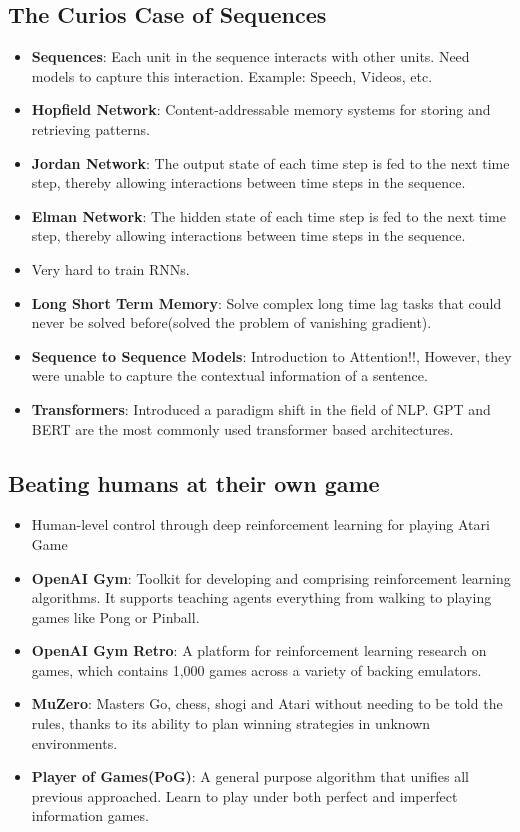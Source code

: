 \documentclass[a4paper]{article}
\begin{document}
\subsection{The Curios Case of Sequences}
\begin{itemize}
    \item \textbf{Sequences}: Each unit in the sequence interacts with other units. Need models to capture this interaction. Example: Speech, Videos, etc.
    \item \textbf{Hopfield Network}: Content-addressable memory systems for storing and retrieving patterns.
    \item \textbf{Jordan Network}: The output state of each time step is fed to the next time step, thereby allowing interactions between time steps in the sequence.
    \item \textbf{Elman Network}: The hidden state of each time step is fed to the next time step, thereby allowing interactions between time steps in the sequence.
    \item Very hard to train RNNs.
    \item \textbf{Long Short Term Memory}: Solve complex long time lag tasks that could never be solved before(solved the problem of vanishing gradient).
    \item \textbf{Sequence to Sequence Models}: Introduction to Attention!!, However, they were unable to capture the contextual information of a sentence.
    \item \textbf{Transformers}: Introduced a paradigm shift in the field of NLP. GPT and BERT are the most commonly used transformer based architectures.
\end{itemize}

\subsection{Beating humans at their own game}
\begin{itemize}
    \item Human-level control through deep reinforcement learning for playing Atari Game
    \item \textbf{OpenAI Gym}: Toolkit for developing and comprising reinforcement learning algorithms. It supports teaching agents everything from walking to playing games like Pong or Pinball.
    \item \textbf{OpenAI Gym Retro}: A platform for reinforcement learning research on games, which contains 1,000 games across a variety of backing emulators.
    \item \textbf{MuZero}: Masters Go, chess, shogi and Atari without needing to be told the rules, thanks to its ability to plan winning strategies in unknown environments.
    \item \textbf{Player of Games(PoG)}: A general purpose algorithm that unifies all previous approached. Learn to play under both perfect and imperfect information games.
\end{itemize}
\end{document}
